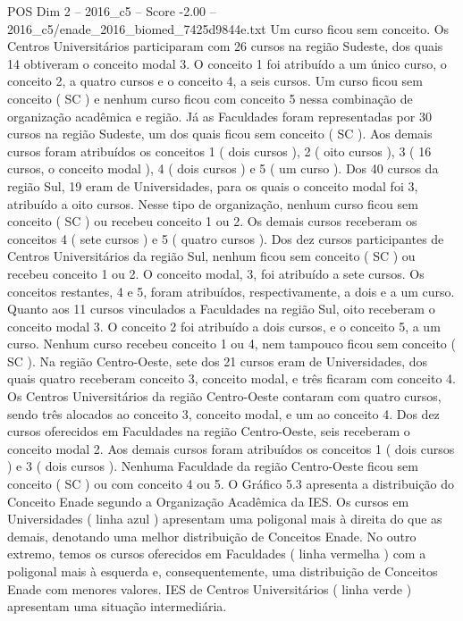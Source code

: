 \begin{textsample}{POS Dim 2 – 2016\_c5 – Score -2.00 – 2016\_c5/enade\_2016\_biomed\_7425d9844e.txt}
Um curso ficou sem conceito.
Os Centros Universitários participaram com 26 cursos na região Sudeste, dos quais 14 obtiveram o conceito modal 3.
O conceito 1 foi atribuído a um único curso, o conceito 2, a quatro cursos e o conceito 4, a seis cursos.
Um curso ficou sem conceito ( SC ) e nenhum curso ficou com conceito 5 nessa combinação de organização acadêmica e região.
Já as Faculdades foram representadas por 30 cursos na região Sudeste, um dos quais ficou sem conceito ( SC ).
Aos demais cursos foram atribuídos os conceitos 1 ( dois cursos ), 2 ( oito cursos ), 3 ( 16 cursos, o conceito modal ), 4 ( dois cursos ) e 5 ( um curso ).
Dos 40 cursos da região Sul, 19 eram de Universidades, para os quais o conceito modal foi 3, atribuído a oito cursos.
Nesse tipo de organização, nenhum curso ficou sem conceito ( SC ) ou recebeu conceito 1 ou 2.
Os demais cursos receberam os conceitos 4 ( sete cursos ) e 5 ( quatro cursos ).
Dos dez cursos participantes de Centros Universitários da região Sul, nenhum ficou sem conceito ( SC ) ou recebeu conceito 1 ou 2.
O conceito modal, 3, foi atribuído a sete cursos.
Os conceitos restantes, 4 e 5, foram atribuídos, respectivamente, a dois e a um curso.
Quanto aos 11 cursos vinculados a Faculdades na região Sul, oito receberam o conceito modal 3.
O conceito 2 foi atribuído a dois cursos, e o conceito 5, a um curso.
Nenhum curso recebeu conceito 1 ou 4, nem tampouco ficou sem conceito ( SC ).
Na região Centro-Oeste, sete dos 21 cursos eram de Universidades, dos quais quatro receberam conceito 3, conceito modal, e três ficaram com conceito 4.
Os Centros Universitários da região Centro-Oeste contaram com quatro cursos, sendo três alocados ao conceito 3, conceito modal, e um ao conceito 4.
Dos dez cursos oferecidos em Faculdades na região Centro-Oeste, seis receberam o conceito modal 2.
Aos demais cursos foram atribuídos os conceitos 1 ( dois cursos ) e 3 ( dois cursos ).
Nenhuma Faculdade da região Centro-Oeste ficou sem conceito ( SC ) ou com conceito 4 ou 5.
O Gráfico 5.3 apresenta a distribuição do Conceito Enade segundo a Organização Acadêmica da IES.
Os cursos em Universidades ( linha azul ) apresentam uma poligonal mais à direita do que as demais, denotando uma melhor distribuição de Conceitos Enade.
No outro extremo, temos os cursos oferecidos em Faculdades ( linha vermelha ) com a poligonal mais à esquerda e, consequentemente, uma distribuição de Conceitos Enade com menores valores.
IES de Centros Universitários ( linha verde ) apresentam uma situação intermediária.

\end{textsample}
